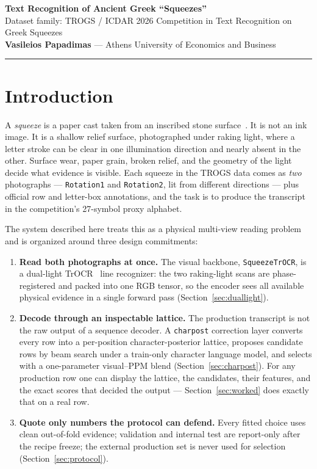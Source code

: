 \documentclass[11pt]{article}
\newcommand{\squeeze}{\textit{squeeze}}
\newcommand{\model}{\texttt{SqueezeTrOCR}}
\newcommand{\charpost}{\texttt{charpost}}
\begin{document}
\begin{center}
  {\LARGE\bfseries Text Recognition of Ancient Greek ``Squeezes''}\\[6pt]
  {\small Dataset family: TROGS / ICDAR 2026 Competition in Text Recognition on Greek Squeezes}\\[8pt]
  {\small\textbf{Vasileios Papadimas} --- Athens University of Economics and Business}\\[5pt]
\end{center}
\vspace{0.6ex}
\hrule
\vspace{1.2ex}

\section{Introduction}
A \squeeze{} is a paper cast taken from an inscribed stone surface~\cite{howe2025}. It is not an ink image. It is a
shallow relief surface, photographed under raking light, where a letter stroke can be clear in one
illumination direction and nearly absent in the other. Surface wear, paper grain, broken relief, and
the geometry of the light decide what evidence is visible. Each squeeze in the TROGS data comes as
\emph{two} photographs --- \texttt{Rotation1} and \texttt{Rotation2}, lit from different directions
--- plus official row and letter-box annotations, and the task is to produce the transcript in the
competition's 27-symbol proxy alphabet.

The system described here treats this as a physical multi-view reading problem and is organized
around three design commitments:

\begin{enumerate}
  \item \textbf{Read both photographs at once.} The visual backbone, \model{}, is a dual-light
        TrOCR~\cite{li2023} line recognizer: the two raking-light scans are phase-registered and packed into one
        RGB tensor, so the encoder sees all available physical evidence in a single forward pass
        (Section~\ref{sec:duallight}).
  \item \textbf{Decode through an inspectable lattice.} The production transcript is not the raw
        output of a sequence decoder. A \charpost{} correction layer converts every row into a
        per-position character-posterior lattice, proposes candidate rows by beam search under a
        train-only character language model, and selects with a one-parameter visual--PPM blend
        (Section~\ref{sec:charpost}). For any production row one can display the lattice, the
        candidates, their features, and the exact scores that decided the output ---
        Section~\ref{sec:worked} does exactly that on a real row.
  \item \textbf{Quote only numbers the protocol can defend.} Every fitted choice uses clean
        out-of-fold evidence; validation and internal test are report-only after the recipe freeze;
        the external production set is never used for selection (Section~\ref{sec:protocol}).
\end{enumerate}
\end{document}
